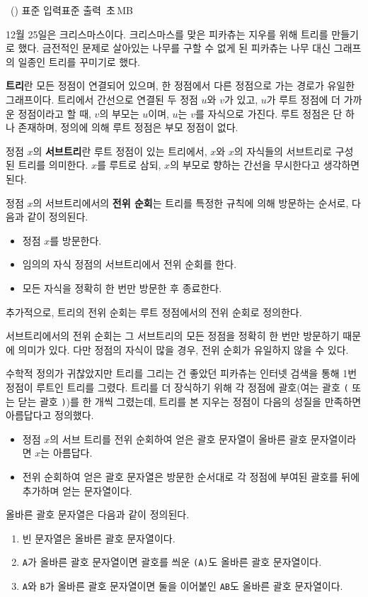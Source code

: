 \begin{problem}{\kcpcprobpretty\ (\kcpcprobprettyshort)}
    {표준 입력}{표준 출력}
    {\kcpcprobprettytime\,초}{\kcpcprobprettymemory\,MB}{}
    
    12월 25일은 크리스마스이다. 크리스마스를 맞은 피카츄는 지우를 위해 트리를 만들기로 했다. 금전적인 문제로 살아있는 나무를 구할 수 없게 된 피카츄는 나무 대신 그래프의 일종인 트리를 꾸미기로 했다.
    
    \textbf{트리}란 모든 정점이 연결되어 있으며, 한 정점에서 다른 정점으로 가는 경로가 유일한 그래프이다. 트리에서 간선으로 연결된 두 정점 $u$와 $v$가 있고, $u$가 루트 정점에 더 가까운 정점이라고 할 때, $v$의 부모는 $u$이며, $u$는 $v$를 자식으로 가진다. 루트 정점은 단 하나 존재하며, 정의에 의해 루트 정점은 부모 정점이 없다.
    
    정점 $x$의 \textbf{서브트리}란 루트 정점이 있는 트리에서, $x$와 $x$의 자식들의 서브트리로 구성된 트리를 의미한다. $x$를 루트로 삼되, $x$의 부모로 향하는 간선을 무시한다고 생각하면 된다.
    
    정점 $x$의 서브트리에서의 \textbf{전위 순회}는 트리를 특정한 규칙에 의해 방문하는 순서로, 다음과 같이 정의된다.
    
    \begin{itemize}
        \item 정점 $x$를 방문한다.
        \item 임의의 자식 정점의 서브트리에서 전위 순회를 한다.
        \item 모든 자식을 정확히 한 번만 방문한 후 종료한다.
    \end{itemize}
    추가적으로, 트리의 전위 순회는 루트 정점에서의 전위 순회로 정의한다.
    
    서브트리에서의 전위 순회는 그 서브트리의 모든 정점을 정확히 한 번만 방문하기 때문에 의미가 있다. 다만 정점의 자식이 많을 경우, 전위 순회가 유일하지 않을 수 있다. 
    
    수학적 정의가 귀찮았지만 트리를 그리는 건 좋았던 피카츄는 인터넷 검색을 통해 1번 정점이 루트인 트리를 그렸다. 트리를 더 장식하기 위해 각 정점에 괄호(여는 괄호 \verb|(| 또는 닫는 괄호 \verb|)|)를 한 개씩 그렸는데, 트리를 본 지우는 정점이 다음의 성질을 만족하면 아름답다고 정의했다.
    
    \begin{itemize}
        \item 정점 $ x $의 서브 트리를 전위 순회하여 얻은 괄호 문자열이 올바른 괄호 문자열이라면 $ x $는 아름답다.
        \item 전위 순회하여 얻은 괄호 문자열은 방문한 순서대로 각 정점에 부여된 괄호를 뒤에 추가하며 얻는 문자열이다.
    \end{itemize}
    올바른 괄호 문자열은 다음과 같이 정의된다.
    \begin{enumerate}
        \item 빈 문자열은 올바른 괄호 문자열이다.
        \item \verb|A|가 올바른 괄호 문자열이면 괄호를 씌운 \verb|(A)|도 올바른 괄호 문자열이다.
        \item \verb|A|와 \verb|B|가 올바른 괄호 문자열이면 둘을 이어붙인 \verb|AB|도 올바른 괄호 문자열이다.
    \end{enumerate}
    

\end{problem}
